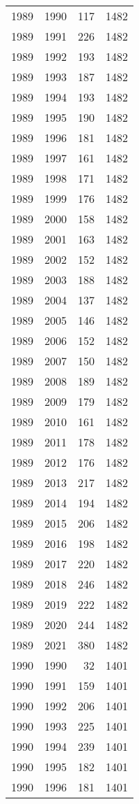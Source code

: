 \documentclass[
  11pt,
  letterpaper,
  DIV=11,
  numbers=noendperiod,
  twoside]{scrartcl}
\begin{document}
\begin{longtable}[]{@{}rrrr@{}}
1989 & 1990 & 117 & 1482 \\
1989 & 1991 & 226 & 1482 \\
1989 & 1992 & 193 & 1482 \\
1989 & 1993 & 187 & 1482 \\
1989 & 1994 & 193 & 1482 \\
1989 & 1995 & 190 & 1482 \\
1989 & 1996 & 181 & 1482 \\
1989 & 1997 & 161 & 1482 \\
1989 & 1998 & 171 & 1482 \\
1989 & 1999 & 176 & 1482 \\
1989 & 2000 & 158 & 1482 \\
1989 & 2001 & 163 & 1482 \\
1989 & 2002 & 152 & 1482 \\
1989 & 2003 & 188 & 1482 \\
1989 & 2004 & 137 & 1482 \\
1989 & 2005 & 146 & 1482 \\
1989 & 2006 & 152 & 1482 \\
1989 & 2007 & 150 & 1482 \\
1989 & 2008 & 189 & 1482 \\
1989 & 2009 & 179 & 1482 \\
1989 & 2010 & 161 & 1482 \\
1989 & 2011 & 178 & 1482 \\
1989 & 2012 & 176 & 1482 \\
1989 & 2013 & 217 & 1482 \\
1989 & 2014 & 194 & 1482 \\
1989 & 2015 & 206 & 1482 \\
1989 & 2016 & 198 & 1482 \\
1989 & 2017 & 220 & 1482 \\
1989 & 2018 & 246 & 1482 \\
1989 & 2019 & 222 & 1482 \\
1989 & 2020 & 244 & 1482 \\
1989 & 2021 & 380 & 1482 \\
1990 & 1990 & 32 & 1401 \\
1990 & 1991 & 159 & 1401 \\
1990 & 1992 & 206 & 1401 \\
1990 & 1993 & 225 & 1401 \\
1990 & 1994 & 239 & 1401 \\
1990 & 1995 & 182 & 1401 \\
1990 & 1996 & 181 & 1401 \\

\end{longtable}
\end{document}
